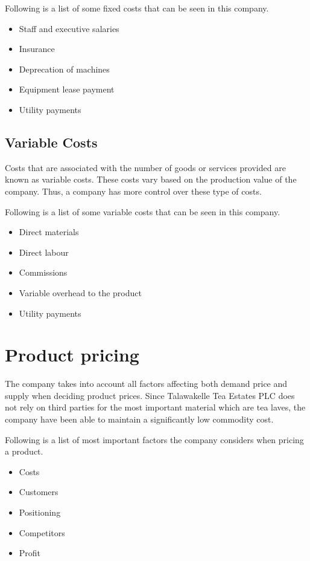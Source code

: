 \documentclass[12pt]{report}
\begin{document}
Following is a list of some fixed costs that can be seen in this company.

\begin{itemize}
	\item {Staff and executive salaries}
	\item {Insurance}
	\item {Deprecation of machines}
	\item {Equipment lease payment}
	\item {Utility payments}
\end{itemize}

\section{Variable Costs}
Costs that are associated with the number of goods or services provided are known as variable costs. These costs vary based on the production value of the company. Thus, a company has more control over these type of costs.


Following is a list of some variable costs that can be seen in this company.

\begin{itemize}
	\item {Direct materials}
	\item {Direct labour}
	\item {Commissions}
	\item {Variable overhead to the product}
	\item {Utility payments}
\end{itemize}


\chapter{Product pricing}
The company takes into account all factors affecting both demand price and supply when deciding product prices. Since Talawakelle Tea Estates PLC does not rely on third parties for the most important material which are tea laves, the company have been able to maintain a significantly low commodity cost.

Following is a list of most important factors the company considers when pricing a product.

\begin{itemize}
	\item {Costs}
	\item {Customers}
	\item {Positioning}
	\item {Competitors}
	\item {Profit}
\end{itemize}
\end{document}
